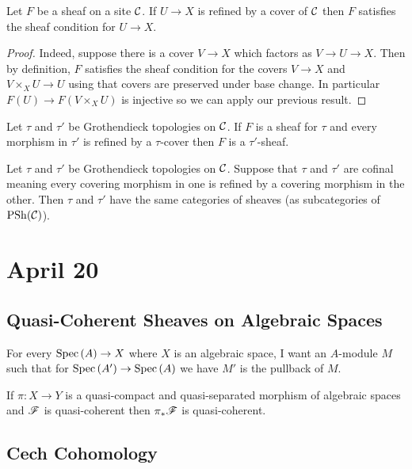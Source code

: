 \documentclass[12pt]{article}
\begin{document}
\begin{cor}
Let $F$ be a sheaf on a site $\mathcal{C}$. If $U \to X$ is refined by a cover of $\mathcal{C}$ then $F$ satisfies the sheaf condition for $U \to X$.
\end{cor}

\begin{proof}
Indeed, suppose there is a cover $V \to X$ which factors as $V \to U \to X$. Then by definition, $F$ satisfies the sheaf condition for the covers $V \to X$ and $V \times_X U \to U$ using that covers are preserved under base change. In particular $F(U) \to F(V \times_X U)$ is injective so we can apply our previous result.
\end{proof}

\begin{cor}
Let $\tau$ and $\tau'$ be Grothendieck topologies on $\mathcal{C}$. If $F$ is a sheaf for $\tau$ and every morphism in $\tau'$ is refined by a $\tau$-cover then $F$ is a $\tau'$-sheaf.
\end{cor}

\begin{cor}
Let $\tau$ and $\tau'$ be Grothendieck topologies on $\mathcal{C}$. Suppose that $\tau$ and $\tau'$ are cofinal meaning every covering morphism in one is refined by a covering morphism in the other. Then $\tau$ and $\tau'$ have the same categories of sheaves (as subcategories of $\mathrm{PSh}(\mathcal{C})$). 
\end{cor}

\section{April 20}

\subsection{Quasi-Coherent Sheaves on Algebraic Spaces}

For every $\mathrm{Spec}\left( A \right) \to X$ where $X$ is an algebraic space, I want an $A$-module $M$ such that for $\mathrm{Spec}\left( A' \right) \to \mathrm{Spec}\left( A \right)$ we have $M'$ is the pullback of $M$. 

\begin{prop}
If $\pi : X \to Y$ is a quasi-compact and quasi-separated morphism of algebraic spaces and $\mathscr{F}$ is quasi-coherent then $\pi_* \mathscr{F}$ is quasi-coherent.
\end{prop}

\subsection{Cech Cohomology}
\end{document}
